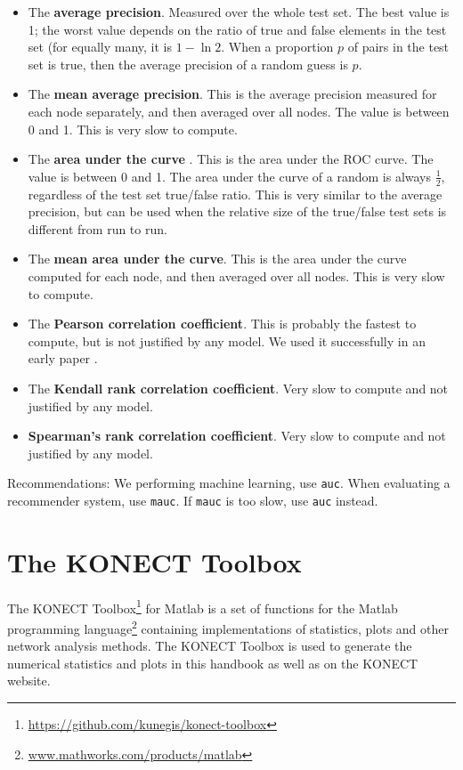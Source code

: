 \documentclass{article}
\begin{document}
\begin{itemize}
\item The \textbf{average precision}.  Measured over the whole test
  set.  The best value is 1; the worst value depends on the ratio of
  true and false elements in the test set (for equally many, it is
  $1-\ln 2$.  When a proportion $p$ of pairs in
  the test set is true, then the average precision of a random guess is
  $p$. 
\item The \textbf{mean average precision}.  This is the average
  precision measured for each node separately, and then averaged over
  all nodes.  The value is between 0 and 1. This is very slow to
  compute. 
\item The \textbf{area under the curve} \citep{b366}.  This is the area under
  the ROC curve.  The value is between 0 and 1. The area under the curve
  of a random is always $\frac 12$, regardless of the test
  set true/false ratio.  This is very similar to the average precision,
  but can be used when the relative size of the true/false test sets is
  different from run to run. 
\item The \textbf{mean area under the curve}.  This is the area
  under the curve computed for each node, and then averaged over all
  nodes. This is very slow to compute. 
\item The \textbf{Pearson correlation coefficient}.  This is probably the
  fastest to compute, but is not justified by any model.  We used it
  successfully in an early paper
  \citep{kunegis:spectral-transformation}. 
\item The \textbf{Kendall rank correlation coefficient}.  Very slow to compute
  and not justified by any model. 
\item \textbf{Spearman's rank correlation coefficient}. 
  Very slow to compute and not
  justified by any model.
\end{itemize}

Recommendations:  We performing machine learning, use \texttt{auc}.  When
evaluating a recommender system, use \texttt{mauc}.
If \texttt{mauc} is too slow, use \texttt{auc} instead. 

\section{The KONECT Toolbox}
\label{sec:toolbox}
The KONECT
Toolbox\footnote{\href{https://github.com/kunegis/konect-toolbox}{https://github.com/kunegis/konect-toolbox}}
for Matlab is a set of functions for the Matlab programming
language\footnote{\href{http://www.mathworks.com/products/matlab/}{www.mathworks.com/products/matlab}}
containing implementations of statistics, plots and other network
analysis methods.  The KONECT Toolbox is used to generate the numerical
statistics and plots in this handbook as well as on the KONECT website.
\end{document}
